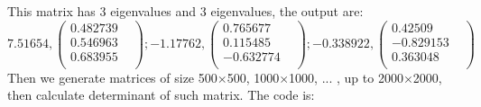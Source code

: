 \documentclass{article}
\begin{document}
This matrix has 3 eigenvalues and 3 eigenvalues, the output are:
\begin{equation}
7.51654, \left(                 
  \begin{array}{c}  
    0.482739 & \\  %
    0.546963 & \\  %
    0.683955 & \\
  \end{array}
\right) ;   -1.17762, \left(                 
  \begin{array}{c}  
    0.765677 & \\  %
    0.115485 & \\  %
    -0.632774 & \\
  \end{array}
\right) ; -0.338922, \left(                 
  \begin{array}{c}  
    0.42509 & \\  %
    -0.829153 & \\  %
    0.363048 & \\
  \end{array}
\right) 
\end{equation}
Then we generate matrices of size 500$\times$500, 1000$\times$1000, ... , up to 2000$\times$2000, then calculate determinant of such matrix. The code is:
\end{document}
